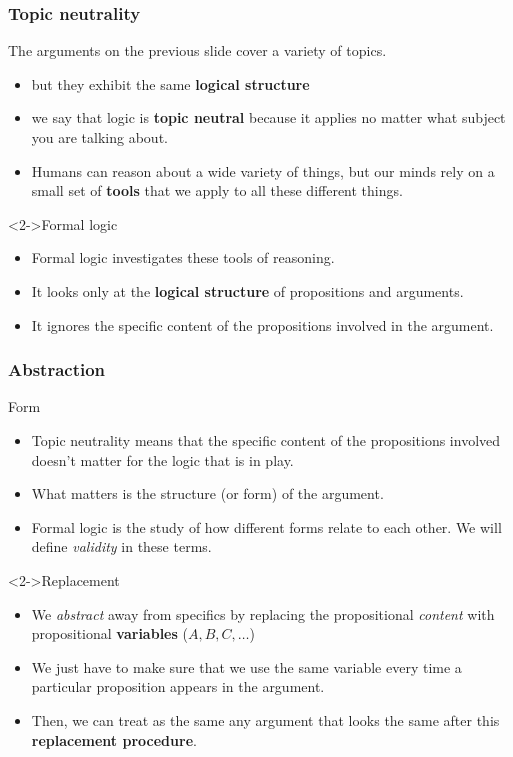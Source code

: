 \documentclass[10pt,letterpaper,xcolor=dvipsnames]{beamer}
\begin{document}
\begin{frame}
\frametitle{Topic neutrality}

\begin{block}{The arguments on the previous slide cover a variety of topics.}
  \begin{itemize}
    \item but they exhibit the same \textbf{logical structure}
    \item we say that logic is \textbf{topic neutral} because it applies no matter what subject you are talking about.
    \item Humans can reason about a wide variety of things, but our minds rely on a small set of \textbf{tools} that we apply to all these different things.
  \end{itemize}
\end{block}

\begin{block}<2->{Formal logic}
  \begin{itemize}
    \item Formal logic investigates these tools of reasoning.
    \item It looks only at the \textbf{logical structure} of propositions and arguments.
    \item It ignores the specific content of the propositions involved in the argument.
  \end{itemize}
\end{block}

\end{frame}

\begin{frame}
\frametitle{Abstraction}

\begin{block}{Form}
  \begin{itemize}
    \item Topic neutrality means that the specific content of the propositions involved doesn't matter for the logic that is in play.
    \item What matters is the structure (or form) of the argument.
    \item Formal logic is the study of how different forms relate to each other. We will define \textit{validity} in these terms.
  \end{itemize}
\end{block}

\begin{block}<2->{Replacement}
  \begin{itemize}
    \item We \textit{abstract} away from specifics by replacing the propositional \textit{content} with propositional \textbf{variables} ($A,B,C,\ldots$)
    \item We just have to make sure that we use the same variable every time a particular proposition appears in the argument.
    \item Then, we can treat as the same any argument that looks the same after this \textbf{replacement procedure}.
  \end{itemize}
\end{block}

\end{frame}
\end{document}

